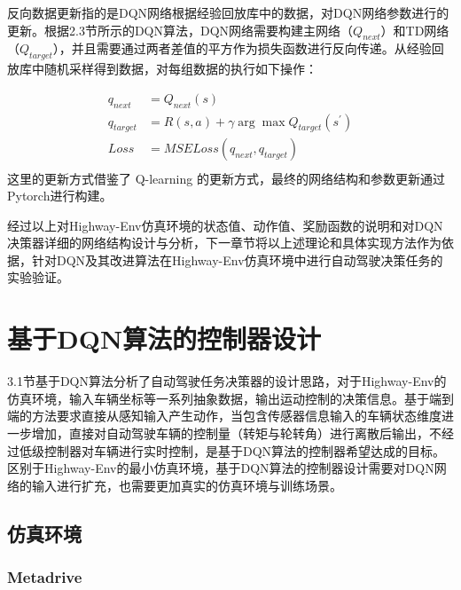 反向数据更新指的是DQN网络根据经验回放库中的数据，对DQN网络参数进行的更新。根据2.3节所示的DQN算法，DQN网络需要构建主网络（$Q_{next}$）和TD网络（$Q_{target}$），并且需要通过两者差值的平方作为损失函数进行反向传递。从经验回放库中随机采样得到数据，对每组数据的执行如下操作：

\begin{equation}
    \begin{aligned}
        q_{next} &= Q_{next}(s)\\
        q_{target} &= R(s,a) + \gamma \arg \max Q_{target}(s^{'})\\
        Loss &= MSELoss(q_{next},q_{target})\\
    \end{aligned}
\end{equation}
这里的更新方式借鉴了 Q-learning 的更新方式，最终的网络结构和参数更新通过Pytorch进行构建。

经过以上对Highway-Env仿真环境的状态值、动作值、奖励函数的说明和对DQN决策器详细的网络结构设计与分析，下一章节将以上述理论和具体实现方法作为依据，针对DQN及其改进算法在Highway-Env仿真环境中进行自动驾驶决策任务的实验验证。

\section{基于DQN算法的控制器设计} %

3.1节基于DQN算法分析了自动驾驶任务决策器的设计思路，对于Highway-Env的仿真环境，输入车辆坐标等一系列抽象数据，输出运动控制的决策信息。基于端到端的方法要求直接从感知输入产生动作，当包含传感器信息输入的车辆状态维度进一步增加，直接对自动驾驶车辆的控制量（转矩与轮转角）进行离散后输出，不经过低级控制器对车辆进行实时控制，是基于DQN算法的控制器希望达成的目标。区别于Highway-Env的最小仿真环境，基于DQN算法的控制器设计需要对DQN网络的输入进行扩充，也需要更加真实的仿真环境与训练场景。

\subsection{仿真环境}

\subsubsection{Metadrive}

